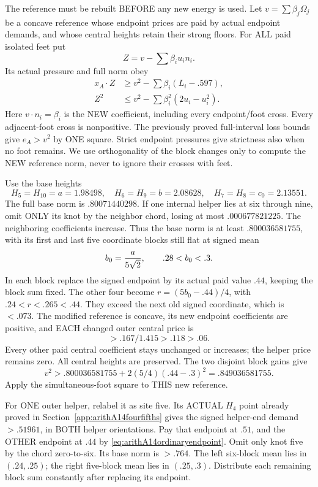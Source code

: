 The reference must be rebuilt BEFORE any
new energy is used.
Let \(v=\sum\beta_j\Omega_j\) be a concave
reference whose endpoint prices are paid
by actual endpoint demands, and whose
central heights retain their strong floors.
For ALL paid isolated feet put
\[
                         Z=v-\sum\beta_i u_i n_i .
\]
Its actual pressure and full norm obey
\[
 \begin{split}
 x_A\cdot Z&\ge v^2-\sum\beta_i(L_i-.597),\\
 Z^2&\le v^2-\sum\beta_i^2(2u_i-u_i^2).
 \end{split}
\]
Here \(v\cdot n_i=\beta_i\) is the NEW
coefficient, including every endpoint/foot
cross.  Every adjacent-foot cross is
nonpositive.
The previously proved full-interval loss
bounds give \(e_A>v^2\) by ONE square.
Strict endpoint pressures give strictness
also when no foot remains.
We use orthogonality of the block changes
only to compute the NEW reference norm,
never to ignore their crosses with feet.

Use the base heights
\[
 H_5=H_{10}=a=1.98498,\quad
 H_6=H_9=b=2.08628,\quad
 H_7=H_8=c_0=2.13551 .
\]
The full base norm is \(.80071440298\).
If one internal helper lies at six through
nine, omit ONLY its knot by the neighbor
chord, losing at most \(.000677821225\).
The neighboring coefficients increase.
Thus the base norm is at least
\(.800036581755\), with its first and
last five coordinate blocks still flat
at signed mean
\[
                           b_0={a\over5\sqrt2},\qquad .28<b_0<.3 .
\]
In each block replace the signed endpoint
by its actual paid value \(.44\), keeping
the block sum fixed.
The other four become
\(r=(5b_0-.44)/4\), with
\(.24<r<.265<.44\).
They exceed the next old signed coordinate,
which is \(<.073\).
The modified reference is concave, its
new endpoint coefficients are positive,
and EACH changed outer central price is
\[
                    >.167/1.415>.118>.06 .
\]
Every other paid central coefficient stays
unchanged or increases; the helper price
remains zero.
All central heights are preserved.
The two disjoint block gains give
\[
              v^2>.800036581755+
                            2(5/4)(.44-.3)^2=.849036581755 .
\tag{A14ord0}\label{eq:arithA14ordinarynoouter}
\]
Apply the simultaneous-foot square to
THIS new reference.

For ONE outer helper, relabel it as site
five.  Its ACTUAL \(H_4\) point already
proved in Section~\ref{app:arithA14fourfifths}
gives the signed helper-end demand \(>.51961\),
in BOTH helper orientations.
Pay that endpoint at \(.51\), and the
OTHER endpoint at \(.44\) by
\eqref{eq:arithA14ordinaryendpoint}.
Omit only knot five by the chord zero-to-six.
Its base norm is \(>.764\).
The left six-block mean lies in \((.24,.25)\);
the right five-block mean lies in \((.25,.3)\).
Distribute each remaining block sum
constantly after replacing its endpoint.

